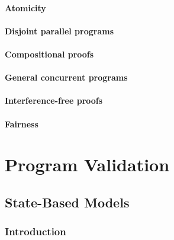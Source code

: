 \documentclass[12pt, a4paper]{book}
\begin{document}
  \subsubsection{Atomicity}
  \label{subs:Atomicity}
  \subsubsection{Disjoint parallel programs}
  \label{subs:Disjoint parallel programs}
  \subsubsection{Compositional proofs}
  \label{subs:Compositional proofs}
  \subsubsection{General concurrent programs}
  \label{subs:General concurrent programs}
  \subsubsection{Interference-free proofs}
  \label{subs:Interference-free proofs}
  \subsubsection{Fairness}
  \label{subs:Fairness}



  \chapter{Program Validation}
  \label{chap:Program Validation}

  \section{State-Based Models}
  \label{sec:State-Based Models}
  \subsection{Introduction}
  \label{sub:Introduction}
\end{document}
